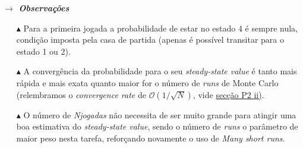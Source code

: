 \noindent\textbf{\textit{$\rightarrow$ Observações}}

\begin{itemize}
    \item[$\blacktriangle$] Para a primeira jogada a probabilidade de estar no estado 4 é sempre nula, condição imposta pela casa de partida (apenas é possível transitar para o estado 1 ou 2).
    
    \item[$\blacktriangle$] A convergência da probabilidade para o seu \textit{steady-state value} é tanto mais rápida e mais exata quanto maior for o número de \textit{runs} de Monte Carlo (relembramos o \textit{convergence rate} de $\mathcal{O}(1/\sqrt{N})$, vide \hyperref[subsubsec:P2ii]{secção P2 ii)}.
    
     \item[$\blacktriangle$] O número de \textit{Njogadas} não necessita de ser muito grande para atingir uma boa estimativa do \textit{steady-state value}, sendo o número de \textit{runs} o parâmetro de maior peso nesta tarefa, reforçando novamente o uso de \textit{Many short runs}.
\end{itemize}

